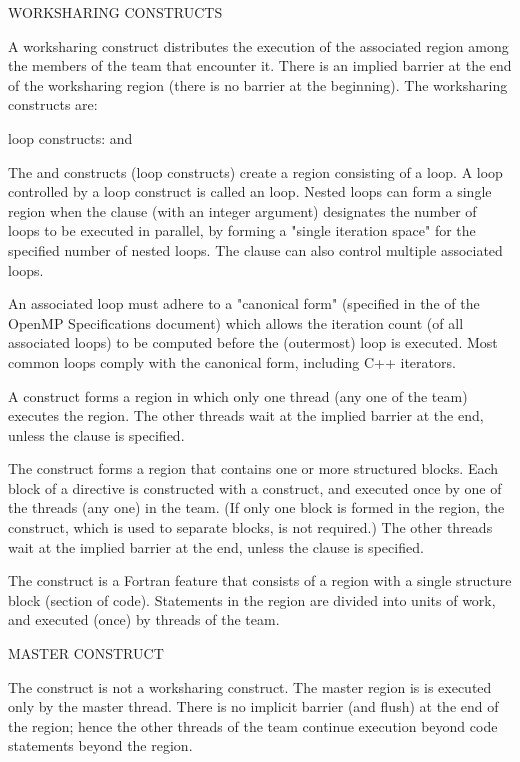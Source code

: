 \pagebreak
WORKSHARING CONSTRUCTS

A worksharing construct distributes the execution of the associated region
among the members of the team that encounter it.  There is an
implied barrier at the end of the worksharing region
(there is no barrier at the beginning). The worksharing
constructs are:

\begin{compactitem}

\item loop constructs: { and  }
\item {}
\item {}
\item {}

\end{compactitem}

The  and  constructs (loop constructs) create a region 
consisting of a loop.  A loop controlled by a loop construct is called 
an  loop.  Nested loops can form a single region when the 
 clause (with an integer argument) designates the number of 
 loops to be executed in parallel, by forming a 
"single iteration space" for the specified number of nested loops.  
The  clause can also control multiple associated loops.

An associated loop must adhere to a "canonical form" (specified in the 
 of the OpenMP Specifications document) which allows the 
iteration count (of all associated loops) to be computed before the 
(outermost) loop is executed. %
Most common loops comply with the canonical form, including C++ iterators.

A  construct forms a region in which only one thread (any one 
of the team) executes the region. 
The other threads wait at the implied 
barrier at the end, unless the  clause is specified.

The  construct forms a region that contains one or more 
structured blocks.  Each block of a  directive is 
constructed with a  construct, and executed once by 
one of the threads (any one) in the team.  (If only one block is 
formed in the region, the  construct, which is used to
separate blocks, is not required.)
The other threads wait at the implied 
barrier at the end, unless the  clause is specified.


The  construct is a Fortran feature that consists of a
region with a single structure block (section of code). Statements in the
 region are divided into units of work, and executed (once)
by threads of the team.  

\bigskip
MASTER CONSTRUCT

The  construct is not a worksharing construct.  The master region is
is executed only by the master thread. There is no implicit barrier (and flush) 
at the end of the  region; hence the other threads of the team continue
execution beyond code statements beyond the  region.
